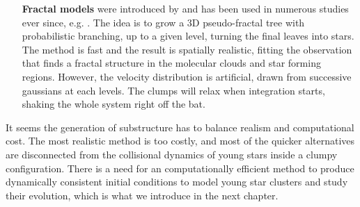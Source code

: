 \begin{itemize}
\item[\textbf{Fractal models}] were introduced by \cite{Goodwin2004} and has been used in numerous studies ever since, e.g. \cite{Allison2009b,Kouwenhoven2010,Parker2016}. The idea is to grow a 3D pseudo-fractal tree with probabilistic branching, up to a given level, turning the final leaves into stars. The method is fast and the result is spatially realistic, fitting the observation that finds a fractal structure in the molecular clouds and star forming regions. However, the velocity distribution is artificial, drawn from successive gaussians at each levels. The clumps will relax when integration starts, shaking the whole system right off the bat.

\end{itemize}

It seems the generation of substructure has to balance realism and computational cost. The most realistic method is too costly, and most of the quicker alternatives are disconnected from  the collisional dynamics of young stars inside a clumpy configuration. There is a need for an computationally efficient method to produce dynamically consistent initial conditions to model young star clusters and study their evolution, which is what we introduce in the next chapter.







